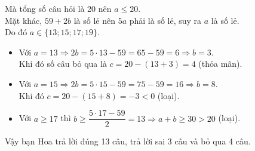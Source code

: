 \begin{bt}
{\begin{enumerate}[a)]
    Mà tổng số câu hỏi là 20 nên $a \le 20$.\\
    Mặt khác, $59 + 2b$ là số lẻ nên $5a$ phải là số lẻ, suy ra $a$ là số lẻ.\\
    Do đó $a \in \{13; 15; 17; 19\}$.
    \begin{itemize}
        \item Với $a = 13 \Rightarrow 2b = 5 \cdot 13 - 59 = 65 - 59 = 6 \Rightarrow b = 3$.\\
        Khi đó số câu bỏ qua là $c = 20 - (13 + 3) = 4$ (thỏa mãn).
        \item Với $a = 15 \Rightarrow 2b = 5 \cdot 15 - 59 = 75 - 59 = 16 \Rightarrow b = 8$.\\
        Khi đó $c = 20 - (15 + 8) = -3 < 0$ (loại).
        \item Với $a \ge 17$ thì $b \ge \dfrac{5 \cdot 17 - 59}{2} = 13 \Rightarrow a + b \ge 30 > 20$ (loại).
    \end{itemize}
    Vậy bạn Hoa trả lời đúng 13 câu, trả lời sai 3 câu và bỏ qua 4 câu.
\end{enumerate}
}
\end{bt}


